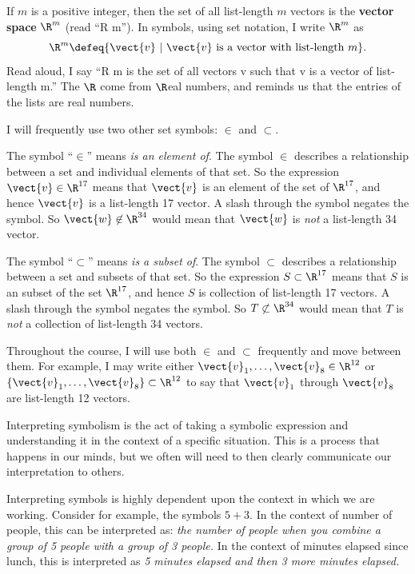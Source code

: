 
\begin{Def}
\label{def:vector_space}
If $m$ is a positive integer, then the set of all list-length $m$ vectors is the \textbf{vector space} $\R^m$ (read ``R  m'').  
In symbols, using set notation, I write $\R^m$ as 
$$\R^m \defeq \{ \vect{v} \ | \ \vect{v} \mbox{ is a vector with list-length } m \}.$$
Read aloud, I say ``R m is the set of all vectors v such that v is a vector of list-length m.'' The $\R$ come from $\R$eal numbers, and reminds us that the entries of the lists are real numbers.
\end{Def}

I will frequently use two other set symbols: $\in$ and $\subset$.  

The symbol ``$\in$'' means \textit{is an element of}.  
The symbol $\in$ describes a relationship between a set and individual elements of that set.  
So the expression
$\vect{v}\in\R^{17}$ means that $\vect{v}$ is an element of the set of $\R^{17}$, and hence $\vect{v}$ is a list-length 17 vector.
A slash through the symbol negates the symbol.  
So $\vect{w}\not\in\R^{34}$ would mean that $\vect{w}$ is \textit{not} a list-length 34 vector.  

The symbol ``$\subset$'' means \textit{is a subset of}.  
The symbol $\subset$ describes a relationship between a set and subsets of that set.  
So the expression
$S \subset \R^{17}$ means that $S$ is an subset of the set $\R^{17}$, and hence $S$ is collection of list-length 17 vectors.
A slash through the symbol negates the symbol.  
So $T\not\subset\R^{34}$ would mean that $T$ is \textit{not} a collection of list-length 34 vectors.  

Throughout the course, I will use both $\in$ and $\subset$ frequently and move between them.  For example,
I may write either $\vect{v}_1,\ldots, \vect{v}_8\in \R^{12}$  or  $\{\vect{v}_1,\ldots, \vect{v}_8\} \subset \R^{12}$ to say that 
$\vect{v}_1$ through $\vect{v}_8$ are list-length 12 vectors.


\newpage

\bsp
\begin{action}
\label{mental_action:interpretting}
Interpreting symbolism is the act of taking a symbolic expression and understanding it in the context of a specific situation.
This is a process that happens in our minds, but we often will need to then clearly communicate our interpretation to others.

\vspace{0.5pc}

Interpreting symbols is highly dependent upon the context in which we are working.
Consider for example, the symbols $5+3$.
In the context of number of people, this can be interpreted as: \textit{the number of people when you combine a group of 5 people with a group of 3 people.}
In the context of minutes elapsed since lunch, this is interpreted as \textit{5 minutes elapsed and then 3 more minutes elapsed.}
\end{action}
\esp




